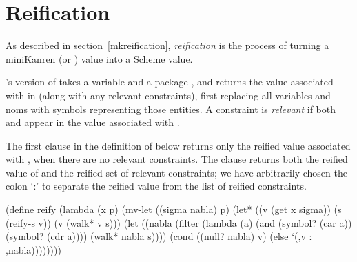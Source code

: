 

\section{Reification}\label{akreifysection}

\enlargethispage{2em}

As described in section~\ref{mkreification}, \emph{reification} is the
process of turning a miniKanren (or \alphakanren) value into a Scheme
value.

\alphakanren's version of  takes a variable 
and a package , and returns the value associated with
 in  (along with any relevant constraints), first
replacing all variables and noms with symbols representing those
entities.  A constraint  is \emph{relevant} if both
 and  appear in the value associated with
.

The first  clause in the definition of 
below returns only the reified value associated with , when
there are no relevant constraints.  The  clause returns
both the reified value of  and the reified set of relevant
constraints; we have arbitrarily chosen the colon `:' to separate the
reified value from the list of reified constraints.

\schemedisplayspace
\begin{schemedisplay}
(define reify
  (lambda (x p)
    (mv-let ((sigma nabla) p)
      (let* ((v (get x sigma)) (s (reify-s v)) (v (walk* v s)))
        (let ((nabla (filter (lambda (a) (and (symbol? (car a)) (symbol? (cdr a))))
                       (walk* nabla s))))
          (cond
            ((null? nabla) v)
            (else `(,v : ,nabla))))))))
\end{schemedisplay}

